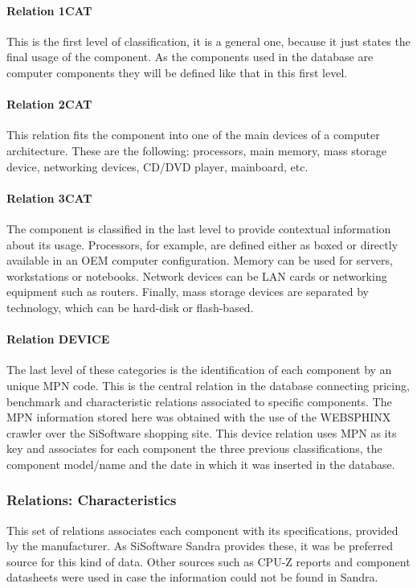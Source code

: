         \paragraph*{Relation 1CAT}%
            This is the first level of classification, it is a general one, because it just states the final usage of the component. As the components used in the database are computer components they will be defined like that in this first level.

        \paragraph*{Relation 2CAT}
            This relation fits the component into one of the main devices of a computer architecture. These are the following: processors, main memory, mass storage device, networking devices, CD/DVD player, mainboard, etc.

        \paragraph*{Relation 3CAT}
            The component is classified in the last level to provide contextual information about its usage. Processors, for example, are defined either as boxed or directly available in an OEM computer configuration. Memory can be used for servers, workstations or notebooks. Network devices can be LAN cards or networking equipment such as routers. Finally, mass storage devices are separated by technology, which can be hard-disk or flash-based.

        \paragraph*{Relation DEVICE}
            The last level of these categories is the identification of each component by an unique MPN code. This is the central relation in the database connecting pricing, benchmark and characteristic relations associated to specific components. The MPN information stored here was obtained with the use of the WEBSPHINX crawler over the SiSoftware shopping site. This device relation uses MPN as its key and associates for each component the three previous classifications, the component model/name and the date in which it was inserted in the database.
            
    \subsubsection*{Relations: Characteristics}
        This set of relations associates each component with its specifications, provided by the manufacturer. As SiSoftware Sandra provides these, it was be preferred source for this kind of data. Other sources such as CPU-Z reports and component datasheets were used in case the information could not be found in Sandra.

